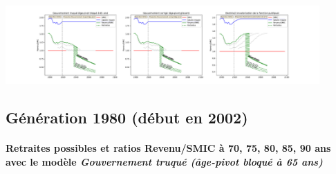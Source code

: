  \begin{center}\includegraphics[width=0.9\textwidth]{fig/AideSoignant_1975_22_dest_retraite.pdf}\end{center} \label{fig/AideSoignant_1975_22_dest_retraite.pdf} 

\newpage 
 
\subsection{Génération 1980 (début en 2002)} 

\paragraph{Retraites possibles et ratios Revenu/SMIC à 70, 75, 80, 85, 90 ans avec le modèle \emph{Gouvernement truqué (âge-pivot bloqué à 65 ans)}}  
 
